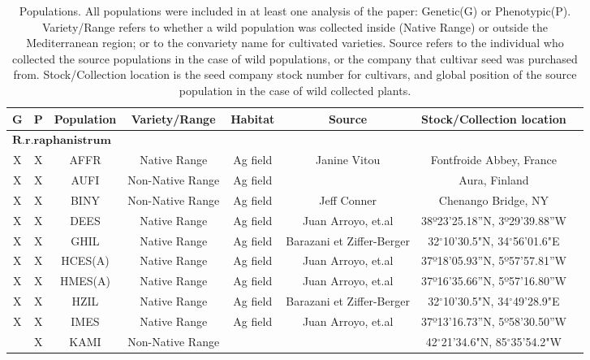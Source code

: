 \documentclass[twocolumn]{bmcart}%
\begin{document}
\begin{backmatter}
\pagebreak


\begin{table}[p]
\caption{Populations. All populations were included in at least one analysis of the paper: Genetic(G) or Phenotypic(P). Variety/Range refers to whether a wild population was collected inside (Native Range) or outside the Mediterranean region; or to the convariety name for cultivated varieties. Source refers to the individual who collected the source populations in the case of wild populations, or the company that cultivar seed was purchased from. Stock/Collection location is the seed company stock number for cultivars, and global position of the source population in the case of wild collected plants.}
      \begin{tabular}{cccccccc}
        \hline
G & P & Population & Variety/Range & Habitat & Source & Stock/Collection location\\ \hline
 \multicolumn{5}{l}{$\boldsymbol{R.r. raphanistrum}$}\\
X & X & AFFR & Native Range & Ag field & Janine Vitou & Fontfroide Abbey, France\\
X & X & AUFI & Non-Native Range & Ag field &  & Aura, Finland\\
X & X & BINY & Non-Native Range & Ag field & Jeff Conner & Chenango Bridge, NY\\
X & X & DEES & Native Range & Ag field & Juan Arroyo, et.al & 38º23’25.18”N, 3º29’39.88”W\\
X & X & GHIL & Native Range & Ag field & Barazani et Ziffer-Berger & 32{\ensuremath{^\circ}}10'30.5"N, 34{\ensuremath{^\circ}}56'01.6"E\\
X & X & HCES(A) & Native Range & Ag field & Juan Arroyo, et.al & 37º18'05.93''N, 5º57'57.81''W\\
X & X & HMES(A) & Native Range & Ag field & Juan Arroyo, et.al & 37º16'35.66''N, 5º57'16.80''W\\
X & X & HZIL & Native Range & Ag field & Barazani et Ziffer-Berger & 32{\ensuremath{^\circ}}10'30.5"N, 34{\ensuremath{^\circ}}49'28.9"E\\
X & X & IMES & Native Range & Ag field & Juan Arroyo, et.al & 37º13'16.73''N, 5º58'30.50''W\\
 & X & KAMI & Non-Native Range &  &  & 42{\ensuremath{^\circ}}21'34.6"N, 85{\ensuremath{^\circ}}35'54.2"W\\

\end{tabular}
\end{table}
\end{backmatter}
\end{document}
